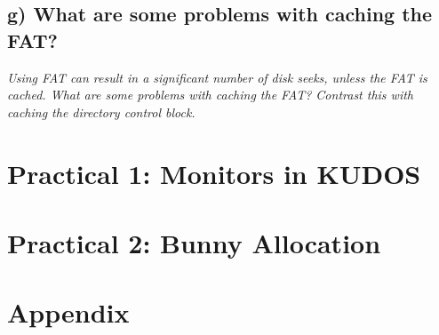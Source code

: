 \documentclass[11pt,a4paper]{article}
\theoremstyle{plain}
\theoremstyle{definition}
\theoremstyle{remark}
\numberwithin{equation}{section}
\begin{document}
\subsection*{g) What are some problems with caching the FAT?}
\textit{Using FAT can result in a significant number of disk seeks, unless the FAT is cached. What are some problems with caching the FAT? Contrast this with caching the directory control block.}


\section*{Practical 1: Monitors in KUDOS}




\section*{Practical 2: Bunny Allocation}



\section*{Appendix}




%
%
\end{document}
